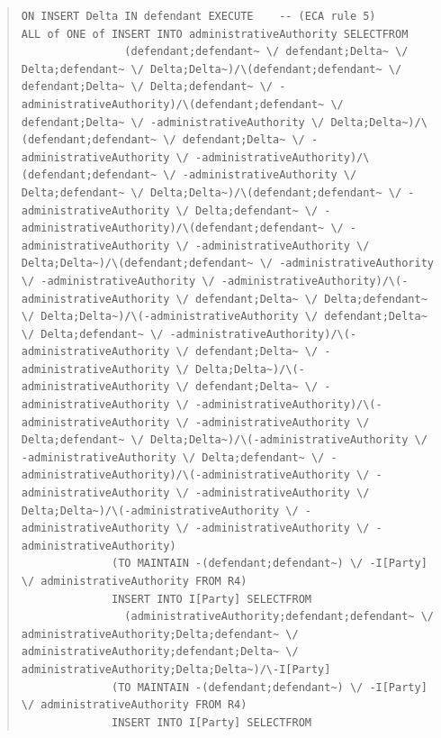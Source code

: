 \documentclass[10pt,a4paper]{report}              %
\theoremstyle{plain}\theorembodyfont{\rmfamily}\newtheorem{definition}{Definition}[section]
\theoremstyle{plain}\theorembodyfont{\rmfamily}\newtheorem{designrule}[definition]{Requirement}
\begin{document}
\begin{quote}
\begin{verbatim}
ON INSERT Delta IN defendant EXECUTE    -- (ECA rule 5)
ALL of ONE of INSERT INTO administrativeAuthority SELECTFROM
                (defendant;defendant~ \/ defendant;Delta~ \/ Delta;defendant~ \/ Delta;Delta~)/\(defendant;defendant~ \/ defendant;Delta~ \/ Delta;defendant~ \/ -administrativeAuthority)/\(defendant;defendant~ \/ defendant;Delta~ \/ -administrativeAuthority \/ Delta;Delta~)/\(defendant;defendant~ \/ defendant;Delta~ \/ -administrativeAuthority \/ -administrativeAuthority)/\(defendant;defendant~ \/ -administrativeAuthority \/ Delta;defendant~ \/ Delta;Delta~)/\(defendant;defendant~ \/ -administrativeAuthority \/ Delta;defendant~ \/ -administrativeAuthority)/\(defendant;defendant~ \/ -administrativeAuthority \/ -administrativeAuthority \/ Delta;Delta~)/\(defendant;defendant~ \/ -administrativeAuthority \/ -administrativeAuthority \/ -administrativeAuthority)/\(-administrativeAuthority \/ defendant;Delta~ \/ Delta;defendant~ \/ Delta;Delta~)/\(-administrativeAuthority \/ defendant;Delta~ \/ Delta;defendant~ \/ -administrativeAuthority)/\(-administrativeAuthority \/ defendant;Delta~ \/ -administrativeAuthority \/ Delta;Delta~)/\(-administrativeAuthority \/ defendant;Delta~ \/ -administrativeAuthority \/ -administrativeAuthority)/\(-administrativeAuthority \/ -administrativeAuthority \/ Delta;defendant~ \/ Delta;Delta~)/\(-administrativeAuthority \/ -administrativeAuthority \/ Delta;defendant~ \/ -administrativeAuthority)/\(-administrativeAuthority \/ -administrativeAuthority \/ -administrativeAuthority \/ Delta;Delta~)/\(-administrativeAuthority \/ -administrativeAuthority \/ -administrativeAuthority \/ -administrativeAuthority)
              (TO MAINTAIN -(defendant;defendant~) \/ -I[Party] \/ administrativeAuthority FROM R4)
              INSERT INTO I[Party] SELECTFROM
                (administrativeAuthority;defendant;defendant~ \/ administrativeAuthority;Delta;defendant~ \/ administrativeAuthority;defendant;Delta~ \/ administrativeAuthority;Delta;Delta~)/\-I[Party]
              (TO MAINTAIN -(defendant;defendant~) \/ -I[Party] \/ administrativeAuthority FROM R4)
              INSERT INTO I[Party] SELECTFROM

\end{verbatim}
\end{quote}
\end{document}
